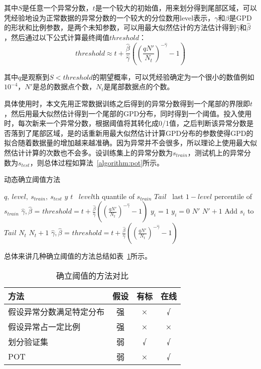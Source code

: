 其中$S$是任意一个异常分数，$t$是一个较大的初始值，用来划分得到尾部区域，可以凭经验地设为正常数据的异常分数的一个较大的分位数用level表示，$\gamma$和$\beta$是GPD的形状和比例参数，是两个未知参数，可以用最大似然估计的方法估计得到$\hat{\gamma}$和$\hat{\beta}$，然后通过以下公式计算最终阈值$threshold$：
\begin{equation*}
  threshold \approx t + \frac{\hat{\beta}}{\hat{\gamma}}((\frac{qN'}{N_{t}})^{-\hat{\gamma}}-1)
\end{equation*}

其中$q$是观察到$S<threshold$的期望概率，可以凭经验确定为一个很小的数值例如$10^{-4}$，$N'$是总的数据点个数，$N_{t}$是尾部数据点的个数。

具体使用时，本文先用正常数据训练之后得到的异常分数得到一个尾部的界限即$t$，然后用最大似然估计得到一个尾部的GPD分布，同时得到一个阈值。投入使用时，每次新来一个异常分数，根据阈值将其转化成0/1值，之后判断该异常分数是否落到了尾部区域，是的话重新用最大似然估计计算GPD分布的参数使得GPD的拟合随着数据量的增加越来越准确。因为异常并不会很多，所以理论上使用最大似然估计计算的次数也不会多。设训练集上的异常分数为$s_{train}$，测试机上的异常分数为$s_{test}$，则总体过程如算法~\ref{algorithm:pot}所示。 

\begin{algorithm}
  \caption{动态确立阈值方法}
  \begin{algorithmic}[1]
      \Require $q,\ level,\ s_{train},\ s_{test}$
      \Ensure $y$
      \State $t$ \gets \ $level$th quantile of $s_{train}$
      \State $Tail$ \gets \ last $1-level$ percentile of $s_{train}$
      \State $\hat{\gamma}, \hat{\beta}$ = 
      \State $threshold = t + \frac{\hat{\beta}}{\hat{\gamma}}((\frac{qN'}{N_{t}})^{-\hat{\gamma}}-1)$ 
      \State $y_i = 1$
      \Else \State $y_i = 0$
      \EndIf
      \State $N'$ \gets $N' + 1 $
      \State Add $s_i$ to $Tail$
      \State $N_t$ \gets $N_t + 1$
      \State $\hat{\gamma}, \hat{\beta}$ = 
      \State $threshold = t + \frac{\hat{\beta}}{\hat{\gamma}}((\frac{qN'}{N_{t}})^{-\hat{\gamma}}-1)$ 
      \EndIf
      \EndFor
  \end{algorithmic}
  \label{algorithm:pot}
\end{algorithm}

总体来讲几种确立阈值的方法总结如表~\ref{tab:threshold}所示。


\begin{table}[htbp]
  \centering
  \begin{tabular}{lccc}
    \toprule
    方法 & 假设 & 有标 & 在线 \\
    \midrule
    假设异常分数满足特定分布 & 强 & × & √ \\
    假设异常占一定比例 & 强 & × & × \\
    划分验证集 & 弱 & √ & √ \\
    POT & 弱 & × & √\\
    \bottomrule
   \end{tabular}
   \caption{确立阈值的方法对比}
   \label{tab:threshold}
\end{table}

